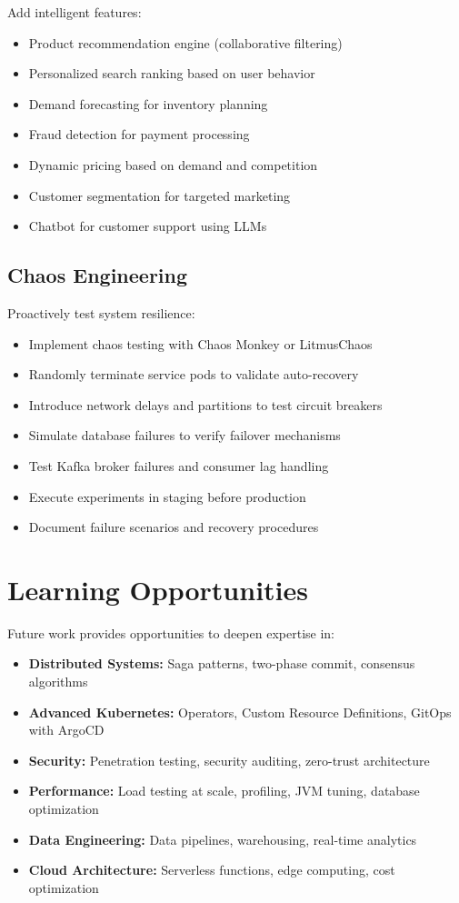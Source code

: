 Add intelligent features:
\begin{itemize}
    \item Product recommendation engine (collaborative filtering)
    \item Personalized search ranking based on user behavior
    \item Demand forecasting for inventory planning
    \item Fraud detection for payment processing
    \item Dynamic pricing based on demand and competition
    \item Customer segmentation for targeted marketing
    \item Chatbot for customer support using LLMs
\end{itemize}

\subsection{Chaos Engineering}

Proactively test system resilience:
\begin{itemize}
    \item Implement chaos testing with Chaos Monkey or LitmusChaos
    \item Randomly terminate service pods to validate auto-recovery
    \item Introduce network delays and partitions to test circuit breakers
    \item Simulate database failures to verify failover mechanisms
    \item Test Kafka broker failures and consumer lag handling
    \item Execute experiments in staging before production
    \item Document failure scenarios and recovery procedures
\end{itemize}

\section{Learning Opportunities}

Future work provides opportunities to deepen expertise in:

\begin{itemize}
    \item \textbf{Distributed Systems:} Saga patterns, two-phase commit, consensus algorithms
    \item \textbf{Advanced Kubernetes:} Operators, Custom Resource Definitions, GitOps with ArgoCD
    \item \textbf{Security:} Penetration testing, security auditing, zero-trust architecture
    \item \textbf{Performance:} Load testing at scale, profiling, JVM tuning, database optimization
    \item \textbf{Data Engineering:} Data pipelines, warehousing, real-time analytics
    \item \textbf{Cloud Architecture:} Serverless functions, edge computing, cost optimization
\end{itemize}

